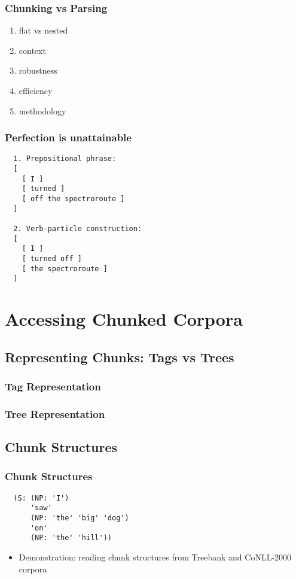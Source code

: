 \documentclass{beamer}             %
\begin{document}
\begin{frame}
  \frametitle{Chunking vs Parsing}
  \begin{enumerate}
  \item flat vs nested
  \item context
  \item robustness
  \item efficiency
  \item methodology
  \end{enumerate}
\end{frame}

\begin{frame}[fragile]
  \frametitle{Perfection is unattainable}

\begin{verbatim}
  1. Prepositional phrase:
  [
    [ I ]
    [ turned ]
    [ off the spectroroute ]
  ]

  2. Verb-particle construction:
  [
    [ I ]
    [ turned off ]
    [ the spectroroute ]
  ]
\end{verbatim}
\end{frame}


\section{Accessing Chunked Corpora}

\subsection{Representing Chunks: Tags vs Trees}

\begin{frame}
  \frametitle{Tag Representation}
  \centerline{}
\end{frame}

\begin{frame}
  \frametitle{Tree Representation}
  \centerline{}
\end{frame}

\subsection{Chunk Structures}

\begin{frame}[fragile]
  \frametitle{Chunk Structures}
\begin{verbatim}
  (S: (NP: 'I')
      'saw'
      (NP: 'the' 'big' 'dog')
      'on'
      (NP: 'the' 'hill'))
\end{verbatim}
  \begin{itemize}
  \item Demonstration: reading chunk structures from Treebank and CoNLL-2000 corpora
  \end{itemize}
\end{frame}
\end{document}
